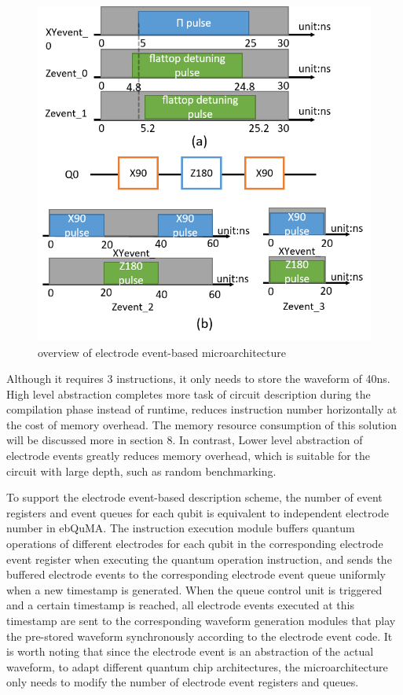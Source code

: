 \begin{figure}[h]
  \centering
  \includegraphics[width=\linewidth]{figure/4_34}
  \caption{overview of electrode event-based microarchitecture}
  \label{img4}
\end{figure}


Although it requires 3 instructions, it only needs to store the waveform of 40ns. 
High level abstraction completes more task of circuit description during the compilation phase instead of runtime, reduces instruction number horizontally
at the cost of memory overhead. The memory resource consumption of this solution will be discussed more in section 8.
In contrast, Lower level abstraction of electrode events greatly reduces memory overhead, which is suitable for the circuit with large depth, such as random benchmarking. 

To support the electrode event-based description scheme, the number of event registers and event queues for each qubit is equivalent to independent electrode number in ebQuMA. 
The instruction execution module buffers quantum operations of different electrodes for each qubit in the corresponding electrode event register when executing the quantum operation instruction, 
and sends the buffered electrode events to the corresponding electrode event queue uniformly when a new timestamp is generated. 
When the queue control unit is triggered and a certain timestamp is reached, 
all electrode events executed at this timestamp are sent to the corresponding waveform generation modules that play the pre-stored waveform synchronously according to the electrode event code.
It is worth noting that since the electrode event is an abstraction of the actual waveform, to adapt different quantum chip architectures, 
the microarchitecture only needs to modify the number of electrode event registers and queues.

